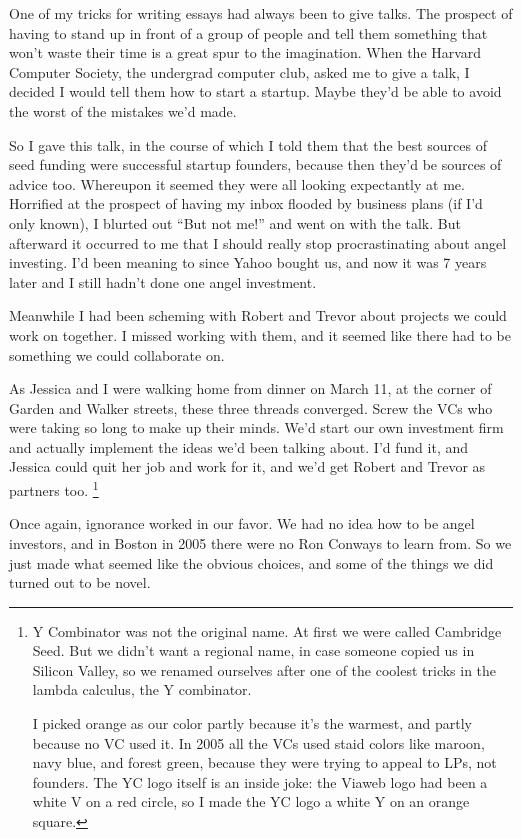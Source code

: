 \documentclass[12pt]{book}
\begin{document}
One of my tricks for writing essays had always been to give talks. The
prospect of having to stand up in front of a group of people and tell
them something that won't waste their time is a great spur to the
imagination. When the Harvard Computer Society, the undergrad computer
club, asked me to give a talk, I decided I would tell them how to start
a startup. Maybe they'd be able to avoid the worst of the mistakes we'd
made.

So I gave this talk, in the course of which I told them that the best
sources of seed funding were successful startup founders, because then
they'd be sources of advice too. Whereupon it seemed they were all
looking expectantly at me. Horrified at the prospect of having my inbox
flooded by business plans (if I'd only known), I blurted out ``But not
me!'' and went on with the talk. But afterward it occurred to me that I
should really stop procrastinating about angel investing. I'd been
meaning to since Yahoo bought us, and now it was 7 years later and I
still hadn't done one angel investment.

Meanwhile I had been scheming with Robert and Trevor about projects we
could work on together. I missed working with them, and it seemed like
there had to be something we could collaborate on.

As Jessica and I were walking home from dinner on March 11, at the
corner of Garden and Walker streets, these three threads converged.
Screw the VCs who were taking so long to make up their minds. We'd start
our own investment firm and actually implement the ideas we'd been
talking about. I'd fund it, and Jessica could quit her job and work for
it, and we'd get Robert and Trevor as partners too.
\footnote{Y Combinator was not the original name. At first we were called
Cambridge Seed. But we didn't want a regional name, in case someone
copied us in Silicon Valley, so we renamed ourselves after one of the
coolest tricks in the lambda calculus, the Y combinator.

I picked orange as our color partly because it's the warmest, and partly
because no VC used it. In 2005 all the VCs used staid colors like
maroon, navy blue, and forest green, because they were trying to appeal
to LPs, not founders. The YC logo itself is an inside joke: the Viaweb
logo had been a white V on a red circle, so I made the YC logo a white Y
on an orange square.}

Once again, ignorance worked in our favor. We had no idea how to be
angel investors, and in Boston in 2005 there were no Ron Conways to
learn from. So we just made what seemed like the obvious choices, and
some of the things we did turned out to be novel.
\end{document}
